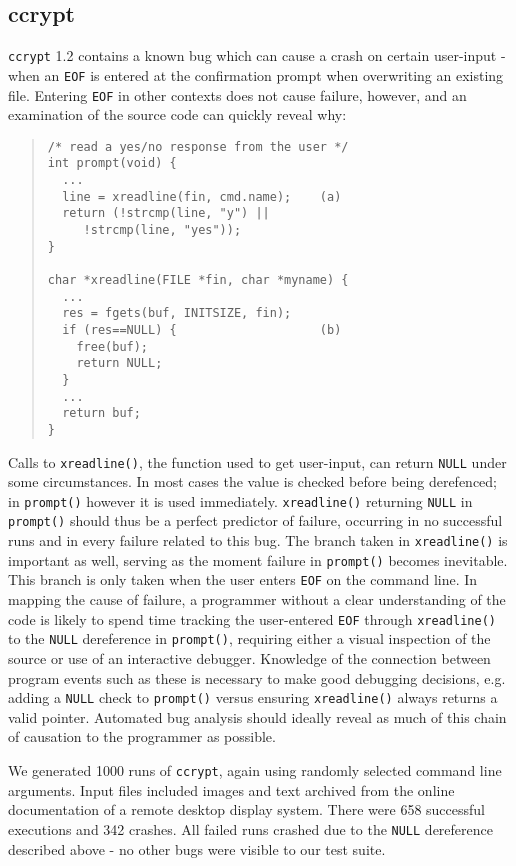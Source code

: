 \subsection{ccrypt}
\texttt{ccrypt} 1.2 contains a known bug which can cause a crash on certain user-input - when an \texttt{EOF} is entered at the confirmation prompt when overwriting an existing file.  Entering \texttt{EOF} in other contexts does not cause failure, however, and an examination of the source code can quickly reveal why:
\begin{quote}
\begin{verbatim}
/* read a yes/no response from the user */
int prompt(void) {
  ...
  line = xreadline(fin, cmd.name);    (a)
  return (!strcmp(line, "y") ||
     !strcmp(line, "yes"));
}

char *xreadline(FILE *fin, char *myname) {
  ...
  res = fgets(buf, INITSIZE, fin);
  if (res==NULL) {                    (b)
    free(buf);
    return NULL;
  }
  ...
  return buf;
}

\end{verbatim}
\end{quote}
Calls to \texttt{xreadline()}, the function used to get user-input, can return \texttt{NULL} under some circumstances.  In most cases the value is checked before being derefenced; in \texttt{prompt()} however it is used immediately.  \texttt{xreadline()} returning \texttt{NULL} in \texttt{prompt()} should thus be a perfect predictor of failure, occurring in no successful runs and in every failure related to this bug.  The branch taken in \texttt{xreadline()} is important as well, serving as the moment failure in \texttt{prompt()} becomes inevitable.  This branch is only taken when the user enters \texttt{EOF} on the command line.  In mapping the cause of failure, a programmer without a clear understanding of the code is likely to spend time tracking the user-entered \texttt{EOF} through \texttt{xreadline()} to the \texttt{NULL} dereference in \texttt{prompt()}, requiring either a visual inspection of the source or use of an interactive debugger.  Knowledge of the connection between program events such as these is necessary to make good debugging decisions, e.g. adding a \texttt{NULL} check to \texttt{prompt()} versus ensuring \texttt{xreadline()} always returns a valid pointer.  Automated bug analysis should ideally reveal as much of this chain of causation to the programmer as possible.

We generated 1000 runs of \texttt{ccrypt}, again using randomly selected command line arguments.  Input files included images and text archived from the online documentation of a remote desktop display system.  There were 658 successful executions and 342 crashes.  All failed runs crashed due to the \texttt{NULL} dereference described above - no other bugs were visible to our test suite.

